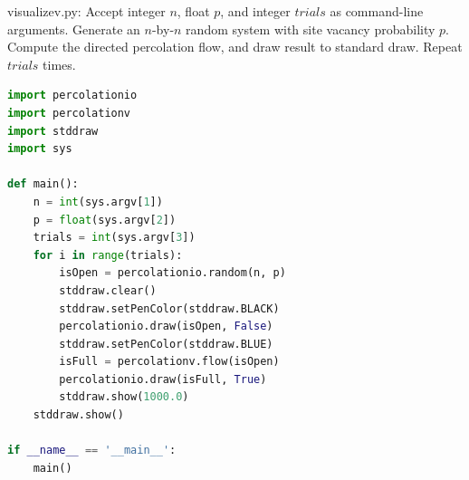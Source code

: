 \documentclass[8pt,a4paper,compress]{beamer}
\begin{document}
\begin{frame}[fragile]
\pause

\begin{framed}
\tiny visualizev.py: Accept integer $n$, float $p$, and integer $trials$ as command-line arguments. Generate an $n$-by-$n$ random system with site vacancy probability $p$. Compute the directed percolation flow, and draw result to standard draw. Repeat $trials$ times.
\end{framed}

\begin{lstlisting}[language=Python]
import percolationio
import percolationv
import stddraw
import sys

def main():
    n = int(sys.argv[1])
    p = float(sys.argv[2])
    trials = int(sys.argv[3])
    for i in range(trials):
        isOpen = percolationio.random(n, p)
        stddraw.clear()
        stddraw.setPenColor(stddraw.BLACK)
        percolationio.draw(isOpen, False)
        stddraw.setPenColor(stddraw.BLUE)
        isFull = percolationv.flow(isOpen)
        percolationio.draw(isFull, True)
        stddraw.show(1000.0)
    stddraw.show()

if __name__ == '__main__':
    main()
\end{lstlisting}
\end{frame}
\end{document}
